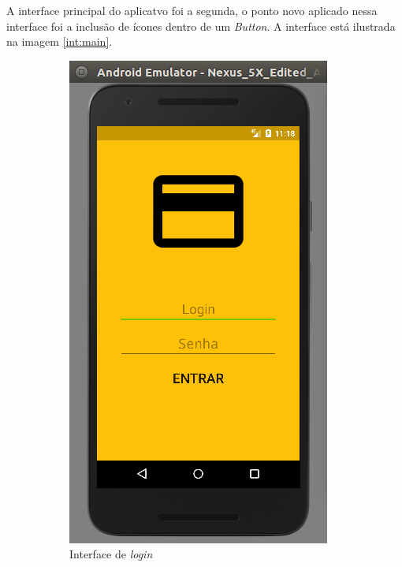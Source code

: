 \documentclass[hidelinks,12pt]{article}
\begin{document}
A interface principal do aplicatvo foi a segunda, o ponto novo aplicado nessa interface foi a inclus\~ao de \'icones dentro de um \textit{Button}. A interface est\'a ilustrada na imagem \ref{int:main}.
\begin{figure}[H]
	\begin{subfigure}{0.5\textwidth}
		\includegraphics[scale=0.5]{int:login}
		\caption{Interface de \textit{login}\\\hspace{\textwidth}\\\hspace{\textwidth}}
		\label{int:login_img}
	\end{subfigure}
	\begin{subfigure}{0.5\textwidth}

\end{subfigure}
\end{figure}
\end{document}
